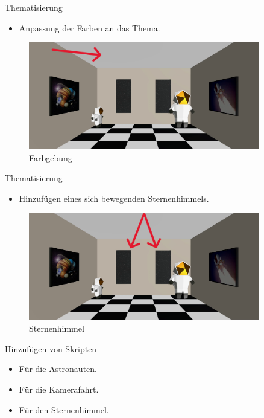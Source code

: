 \documentclass{beamer}
\begin{document}
\begin{frame}{Thematisierung}
\begin{itemize}
\item Anpassung der Farben an das Thema.
\end{itemize}
\begin{figure}
    \centering
\includegraphics[width=0.9\textwidth, keepaspectratio]{thema3}
\caption{Farbgebung}
\end{figure}
\end{frame}

\begin{frame}{Thematisierung}
\begin{itemize}
\item Hinzufügen eines sich bewegenden Sternenhimmels.
\end{itemize}
\begin{figure}
    \centering
\includegraphics[width=0.9\textwidth, keepaspectratio]{thema4}
\caption{Sternenhimmel}
\end{figure}
\end{frame}

\begin{frame}{Hinzufügen von Skripten}
\begin{itemize}
\item Für die Astronauten.
\item Für die Kamerafahrt.
\item Für den Sternenhimmel.
\end{itemize}
\end{frame}
\end{document}
